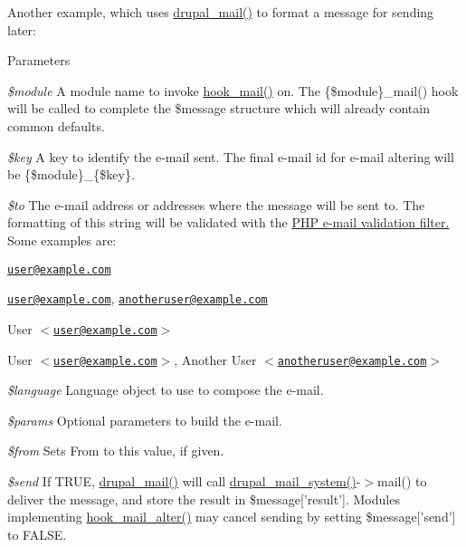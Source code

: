 Another example, which uses \hyperlink{mail_8inc_ab80781fd7273975a77cbbd13300eddbf}{drupal\_\-mail()} to format a message for sending later:





\begin{DoxyParams}{Parameters}
\item[{\em \$module}]A module name to invoke \hyperlink{group__hooks_gacdeb1cba0d0a86ac4de3fff7d4765777}{hook\_\-mail()} on. The \{\$module\}\_\-mail() hook will be called to complete the \$message structure which will already contain common defaults. \item[{\em \$key}]A key to identify the e-\/mail sent. The final e-\/mail id for e-\/mail altering will be \{\$module\}\_\-\{\$key\}. \item[{\em \$to}]The e-\/mail address or addresses where the message will be sent to. The formatting of this string will be validated with the \hyperlink{}{PHP e-\/mail validation filter. } Some examples are:
\begin{DoxyItemize}
\item \href{mailto:user@example.com}{\tt user@example.com}
\item \href{mailto:user@example.com}{\tt user@example.com}, \href{mailto:anotheruser@example.com}{\tt anotheruser@example.com}
\item User $<$\href{mailto:user@example.com}{\tt user@example.com}$>$
\item User $<$\href{mailto:user@example.com}{\tt user@example.com}$>$, Another User $<$\href{mailto:anotheruser@example.com}{\tt anotheruser@example.com}$>$ 
\end{DoxyItemize}\item[{\em \$language}]Language object to use to compose the e-\/mail. \item[{\em \$params}]Optional parameters to build the e-\/mail. \item[{\em \$from}]Sets From to this value, if given. \item[{\em \$send}]If TRUE, \hyperlink{mail_8inc_ab80781fd7273975a77cbbd13300eddbf}{drupal\_\-mail()} will call \hyperlink{mail_8inc_a6ba240b2e368447935c9bcb114f59a1a}{drupal\_\-mail\_\-system()}-\/$>$mail() to deliver the message, and store the result in \$message\mbox{[}'result'\mbox{]}. Modules implementing \hyperlink{group__hooks_gaad1d55a8e7b359933f462a9ca5b2ede0}{hook\_\-mail\_\-alter()} may cancel sending by setting \$message\mbox{[}'send'\mbox{]} to FALSE.\end{DoxyParams}
